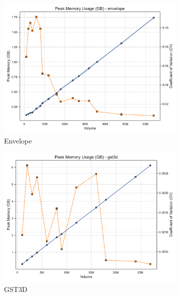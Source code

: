 \begin{figure}[htbp]
    \centering
    \begin{subfigure}[t]{0.32\textwidth}
        \includegraphics[width=\textwidth]{assets/images/05/peak_memory_by_volume_envelope}
        \caption{Envelope}
    \end{subfigure}
    \hfill
    \begin{subfigure}[t]{0.32\textwidth}
        \includegraphics[width=\textwidth]{assets/images/05/peak_memory_by_volume_gst3d}
        \caption{\ac{GST3D}}
    \end{subfigure}
    \hfill
    \begin{subfigure}[t]{0.32\textwidth}

\end{subfigure}
\end{figure}

